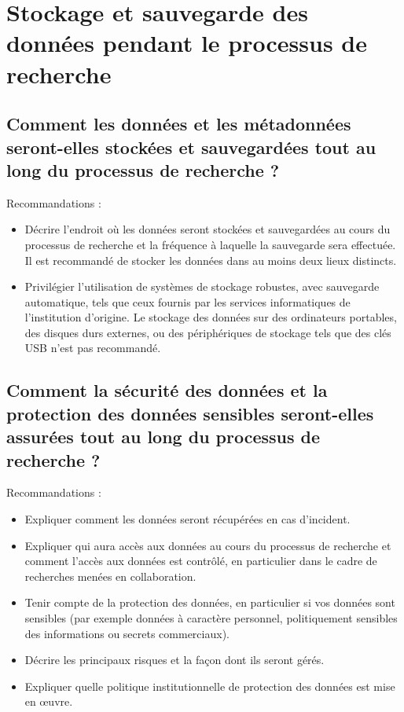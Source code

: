 \documentclass{article}
\begin{document}
\section{Stockage et sauvegarde des données pendant le processus de recherche}
\subsection{Comment les données et les métadonnées seront-elles stockées et sauvegardées tout au long du processus de recherche ?}
Recommandations :
\begin{itemize}
    \item Décrire l'endroit où les données seront stockées et sauvegardées au cours du processus de recherche et la fréquence à laquelle la sauvegarde sera effectuée. Il est recommandé de stocker les données dans au moins deux lieux distincts.
    \item Privilégier l'utilisation de systèmes de stockage robustes, avec sauvegarde automatique, tels que ceux fournis par les services informatiques de l'institution d'origine. Le stockage des données sur des ordinateurs portables, des disques durs externes, ou des périphériques de stockage tels que des clés USB n'est pas recommandé.
\end{itemize}

\subsection{Comment la sécurité des données et la protection des données sensibles seront-elles assurées tout au long du processus de recherche ?}
Recommandations : 
\begin{itemize}
    \item Expliquer comment les données seront récupérées en cas d'incident.
    \item Expliquer qui aura accès aux données au cours du processus de recherche et comment l'accès aux données est contrôlé, en particulier dans le cadre de recherches menées en collaboration.
    \item Tenir compte de la protection des données, en particulier si vos données sont sensibles (par exemple données à caractère personnel, politiquement sensibles des informations ou secrets commerciaux).
    \item Décrire les principaux risques et la façon dont ils seront gérés.
    \item Expliquer quelle politique institutionnelle de protection des données est mise en œuvre.
\end{itemize}
\end{document}
